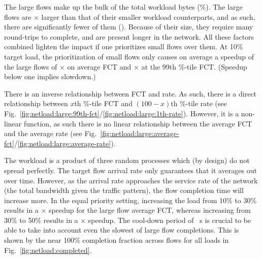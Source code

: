  The large flows make up the bulk of the total workload bytes (\%). The large flows are $\times$ larger than that of their smaller workload counterparts, and as such, there are significantly fewer of them (). Because of their size, they require many round-trips to complete, and are present longer in the network. All these factors combined lighten the impact if one prioritizes small flows over them. At 10\% target load, the prioritization of small flows only causes on average a speedup of the large flows of $\times$ on average FCT and $\times$ at the 99th \%-tile FCT. (Speedup below one implies slowdown.)

 There is an inverse relationship between FCT and rate. As such, there is a direct relationship between $x$th \%-tile FCT and $(100 - x)$th \%-tile rate (see Fig.~\ref{fig:netload:large:99th-fct}/\ref{fig:netload:large:1th-rate}). However, it is a non-linear function, as such there is no linear relationship between the average FCT and the average rate (see Fig.~\ref{fig:netload:large:average-fct}/\ref{fig:netload:large:average-rate}).

 The workload is a product of three random processes which (by design) do not spread perfectly. The target flow arrival rate only guarantees that it averages out over time. However, as the arrival rate approaches the service rate of the network (the total bandwidth given the traffic pattern), the flow completion time will increase more. In the equal priority setting, increasing the load from 10\% to 30\% results in a $\times$ speedup for the large flow average FCT, whereas increasing from 30\% to 50\% results in a $\times$ speedup. The cool-down period of ~s is crucial to be able to take into account even the slowest of large flow completions. This is shown by the near 100\% completion fraction across flows for all loads in Fig.~\ref{fig:netload:completed}.

